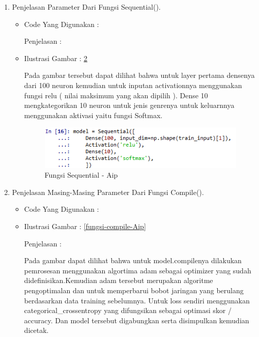 \begin{enumerate}
\begin{itemize}
\begin{itemize}
\begin{figure}[!hbtp]
\caption{Pemisahan Data Training Dan Dataset 2 - Aip}
\label{pemisahan-data-train-set-2-Aip}
\end{figure}
\par
\end{itemize}
\end{itemize}
\par
\par
\item Penjelasan Parameter Dari Fungsi Sequential().
\begin{itemize}
\item Code Yang Digunakan :
\par

\par Penjelasan :
\item Ilustrasi Gambar : \ref{fungsi-sequential-Aip}
\par Pada gambar tersebut dapat dilihat bahwa untuk layer pertama densenya dari 100 neuron kemudian untuk inputan activationnya menggunakan fungsi relu ( nilai maksimum yang akan dipilih ). Dense 10 mengkategorikan 10 neuron untuk jenis genrenya untuk keluarnnya menggunakan aktivasi yaitu fungsi Softmax.
\begin{figure}[!hbtp]
\centering
\includegraphics[scale=0.2]{figures/AIP/sequential.PNG}
\caption{Fungsi Sequential - Aip}
\label{fungsi-sequential-Aip}
\end{figure}
\par
\end{itemize}
\par
\par
\item Penjelasan Masing-Masing Parameter Dari Fungsi Compile().
\begin{itemize}
\item Code Yang Digunakan :
\par

\par
\par
\item Ilustrasi Gambar : \ref{fungsi-compile-Aip}
\par
\par Penjelasan :
\par Pada gambar dapat dilihat bahwa untuk model.compilenya dilakukan pemrosesan menggunakan algortima adam sebagai optimizer yang sudah didefinisikan.Kemudian adam tersebut merupakan algoritme pengoptimalan dan untuk memperbarui bobot jaringan yang berulang berdasarkan data training sebelumnya. Untuk loss sendiri menggunakan categorical\_crossentropy yang difungsikan sebagai optimasi skor / accuracy. Dan model tersebut digabungkan serta disimpulkan kemudian dicetak.

\end{itemize}
\end{enumerate}
